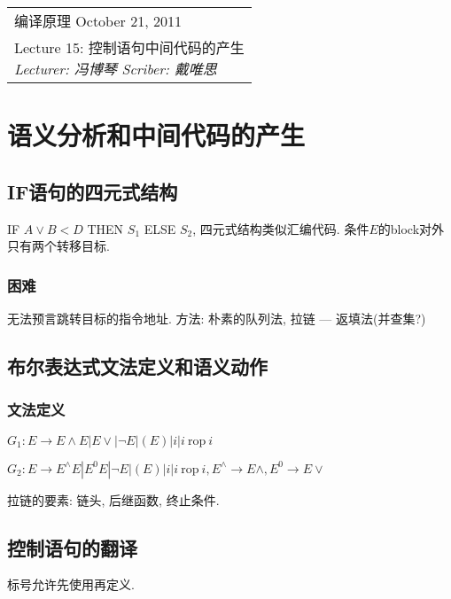 \def\lecture{15}
\clearpage \noindent\begin{tabularx}{\linewidth}{|X|}
\hline \vskip -2mm
{\sf 编译原理} \hfill October 21, 2011 \\
{\centering \sf \large Lecture \lecture:
控制语句中间代码的产生 \\ }
\textsl{Lecturer: 冯博琴 \hfill Scriber: 戴唯思}\\ \hline
\end{tabularx}
\setcounter{section}{0}
\renewcommand{\thepage}{\lecture -\arabic{page}}

\section{语义分析和中间代码的产生}

    \subsection{IF语句的四元式结构}

        IF $A\vee B<D$ THEN $S_1$ ELSE $S_2$, 四元式结构类似汇编代码. 条件$E$的block对外只有两个转移目标.

        \subsubsection{困难}

            无法预言跳转目标的指令地址. 方法: 朴素的队列法, 拉链 --- 返填法(并查集?)

    \subsection{布尔表达式文法定义和语义动作}

        \subsubsection{文法定义}

            $G_1:E\to E\wedge E|E\vee|\neg E|(E)|i|i\mathrm{\ rop\ }i$

            $G_2:E\to E^\wedge E|E^0 E|\neg E|(E)|i|i\mathrm{\ rop\ }i, E^\wedge\to E\wedge, E^0\to E\vee$

            拉链的要素: 链头, 后继函数, 终止条件.

    \subsection{控制语句的翻译}

        标号允许先使用再定义.
